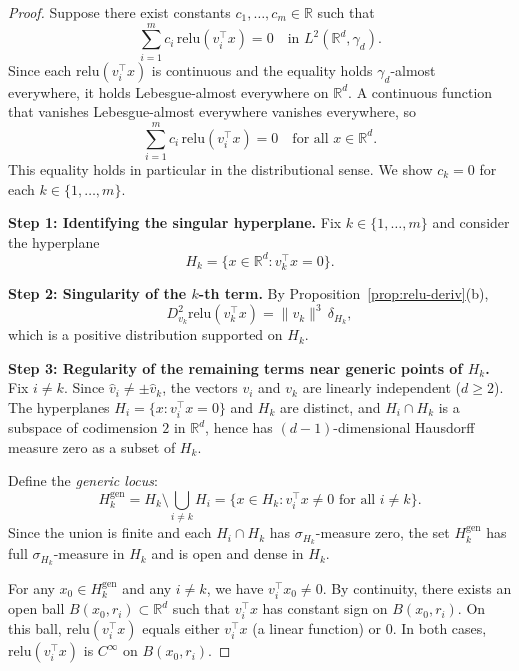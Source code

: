 \documentclass[11pt]{amsart}
\theoremstyle{definition}
\newcommand{\R}{\mathbb{R}}
\newcommand{\norm}[1]{\| #1 \|}
\newcommand{\relu}{\mathrm{relu}}
\begin{document}
\begin{proof}
Suppose there exist constants $c_1, \ldots, c_m \in \R$ such that
\begin{equation}\label{eq:lin-dep}
\sum_{i=1}^{m} c_i \, \relu(v_i^\top x) = 0 \quad \text{in } L^2(\R^d, \gamma_d).
\end{equation}
Since each $\relu(v_i^\top x)$ is continuous and the equality holds $\gamma_d$-almost everywhere, it holds Lebesgue-almost everywhere on $\R^d$. A continuous function that vanishes Lebesgue-almost everywhere vanishes everywhere, so
\begin{equation}\label{eq:lin-dep-pointwise}
\sum_{i=1}^{m} c_i \, \relu(v_i^\top x) = 0 \quad \text{for all } x \in \R^d.
\end{equation}
This equality holds in particular in the distributional sense. We show $c_k = 0$ for each $k \in \{1, \ldots, m\}$.

\medskip

\noindent\textbf{Step 1: Identifying the singular hyperplane.}
Fix $k \in \{1, \ldots, m\}$ and consider the hyperplane
\[
H_k = \{x \in \R^d : v_k^\top x = 0\}.
\]

\medskip

\noindent\textbf{Step 2: Singularity of the $k$-th term.}
By Proposition~\ref{prop:relu-deriv}(b),
\[
D_{v_k}^2 \relu(v_k^\top x) = \norm{v_k}^3 \, \delta_{H_k},
\]
which is a positive distribution supported on $H_k$.

\medskip

\noindent\textbf{Step 3: Regularity of the remaining terms near generic points of $H_k$.}
Fix $i \neq k$. Since $\hat{v}_i \neq \pm \hat{v}_k$, the vectors $v_i$ and $v_k$ are linearly independent ($d \geq 2$). The hyperplanes $H_i = \{x : v_i^\top x = 0\}$ and $H_k$ are distinct, and $H_i \cap H_k$ is a subspace of codimension $2$ in $\R^d$, hence has $(d{-}1)$-dimensional Hausdorff measure zero as a subset of $H_k$.

Define the \emph{generic locus}:
\[
H_k^{\mathrm{gen}} = H_k \setminus \bigcup_{i \neq k} H_i = \{x \in H_k : v_i^\top x \neq 0 \text{ for all } i \neq k\}.
\]
Since the union is finite and each $H_i \cap H_k$ has $\sigma_{H_k}$-measure zero, the set $H_k^{\mathrm{gen}}$ has full $\sigma_{H_k}$-measure in $H_k$ and is open and dense in $H_k$.

For any $x_0 \in H_k^{\mathrm{gen}}$ and any $i \neq k$, we have $v_i^\top x_0 \neq 0$. By continuity, there exists an open ball $B(x_0, r_i) \subset \R^d$ such that $v_i^\top x$ has constant sign on $B(x_0, r_i)$. On this ball, $\relu(v_i^\top x)$ equals either $v_i^\top x$ (a linear function) or $0$. In both cases, $\relu(v_i^\top x)$ is $C^\infty$ on $B(x_0, r_i)$.


\end{proof}
\end{document}
